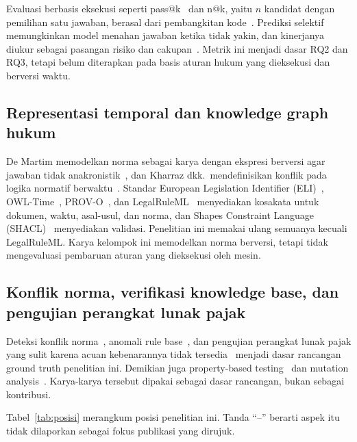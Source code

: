 \documentclass[conference]{IEEEtran}
\makeatletter
\DeclareRobustCommand{\en}[1]{{\usefont{\f@encoding}{\f@family}{\f@series}{it}#1\/}}
\makeatother
\begin{document}
Evaluasi berbasis eksekusi seperti \en{pass@k}~\cite{chen2021evaluating} dan \en{n@k}, yaitu $n$ kandidat dengan pemilihan satu jawaban, berasal dari pembangkitan kode~\cite{li2022alphacode}. Prediksi selektif memungkinkan model menahan jawaban ketika tidak yakin, dan kinerjanya diukur sebagai pasangan risiko dan cakupan~\cite{xin2021abstention}. Metrik ini menjadi dasar RQ2 dan RQ3, tetapi belum diterapkan pada basis aturan hukum yang dieksekusi dan berversi waktu.

\subsection{Representasi temporal dan \en{knowledge graph} hukum}
De Martim memodelkan norma sebagai karya dengan ekspresi berversi agar jawaban tidak anakronistik~\cite{demartim2025satgraph}, dan Kharraz dkk.\ mendefinisikan konflik pada logika normatif berwaktu~\cite{kharraz2024conflicts}. Standar \en{European Legislation Identifier} (ELI)~\cite{publicationsoffice2026eli}, OWL-Time~\cite{cox2017owltime}, PROV-O~\cite{lebo2013provo}, dan LegalRuleML~\cite{palmirani2021legalruleml} menyediakan kosakata untuk dokumen, waktu, asal-usul, dan norma, dan \en{Shapes Constraint Language} (SHACL)~\cite{knublauch2017shacl} menyediakan validasi. Penelitian ini memakai ulang semuanya kecuali LegalRuleML. Karya kelompok ini memodelkan norma berversi, tetapi tidak mengevaluasi pembaruan aturan yang dieksekusi oleh mesin.

\subsection{Konflik norma, verifikasi \en{knowledge base}, dan pengujian perangkat lunak pajak}
Deteksi konflik norma~\cite{robaldo2024compliance,khoja2026consistency}, anomali \en{rule base}~\cite{boujelben2025anomalies}, dan pengujian perangkat lunak pajak yang sulit karena acuan kebenarannya tidak tersedia~\cite{tizpaz2023metamorphic,li2025mrgeneration} menjadi dasar rancangan \en{ground truth} penelitian ini. Demikian juga \en{property-based testing}~\cite{goldstein2024pbt,ravi2025pbtpython} dan \en{mutation analysis}~\cite{petrovic2022mutation,petrovic2021mutation}. Karya-karya tersebut dipakai sebagai dasar rancangan, bukan sebagai kontribusi.

Tabel~\ref{tab:posisi} merangkum posisi penelitian ini. Tanda ``--'' berarti aspek itu tidak dilaporkan sebagai fokus publikasi yang dirujuk.
\end{document}
